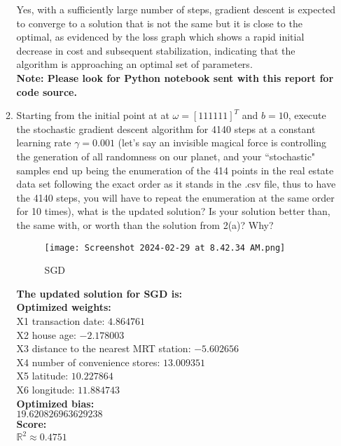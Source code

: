 \documentclass{assignment}
\newcommand{\R}{\mathbb{R}}
\begin{document}
\begin{problem}
\begin{enumerate}
\begin{enumerate}
    Yes, with a sufficiently large number of steps, gradient descent is expected to converge to a solution that is not the same but it is close to the optimal, as evidenced by the loss graph which shows a rapid initial decrease in cost and subsequent stabilization, indicating that the algorithm is approaching an optimal set of parameters.\\

    \textbf{Note: Please look for Python notebook sent with this report for code source.}\\

    \item Starting from the initial point at at $ω = [1 1 1 1 1 1]^T$ and $b = 10$, execute the stochastic gradient descent algorithm for 4140 steps at a constant learning rate $γ = 0.001$ (let’s say an invisible magical force is controlling the generation of all randomness on our planet, and your “stochastic" samples end up being the enumeration of the 414 points in the real estate data set following the exact order as it stands in the .csv file, thus to have the 4140 steps, you will have to repeat the enumeration at the same order for 10 times), what is the updated solution? Is your solution better than, the same with, or worth than the solution from 2(a)? Why?\\

    \begin{figure}[H]
        \centering
        \texttt{[image: Screenshot 2024-02-29 at 8.42.34 AM.png]}
        \caption{SGD}
        \label{fig:enter-label}
    \end{figure}

    \textbf{The updated solution for SGD is:} \\
    \textbf{Optimized weights: }\\
    X1 transaction date: $4.864761$\\
    X2 house age: $-2.178003$\\
    X3 distance to the nearest MRT station: $-5.602656$\\
    X4 number of convenience stores: $13.009351$\\
    X5 latitude: $10.227864$\\
    X6 longitude: $11.884743$\\

    \textbf{Optimized bias:} \\$19.620826963629238$ \\

    \textbf{Score:}\\
    $\R^2 \approx 0.4751$\\


\end{enumerate}
\end{enumerate}
\end{problem}
\end{document}
